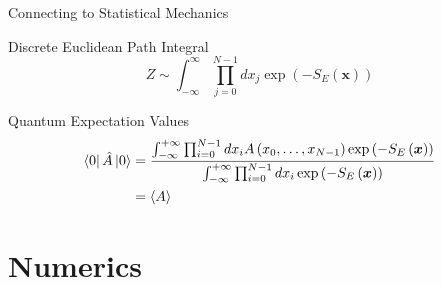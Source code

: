 \documentclass{beamer}
\begin{document}
    \begin{frame}{Connecting to Statistical Mechanics}
        {

            \begin{block}{Discrete Euclidean Path Integral}
                {  
                    \begin{equation*}
                        \label{eq:DiscreteEuclideanPathIntegral}
                        Z \sim \int^{\infty}_{-\infty}\prod^{N-1}_{j=0}dx_{j} \exp{\left(-S_E\left(\bm{x}\right)\right)}
                    \end{equation*}
                }
            \end{block}
        }

        {

            \begin{block}{Quantum Expectation Values}
                {  
                    \begin{align*}
                        \label{eq:SpecialEXP}
                        \bra{0}\hat{A}\ket{0} & = \frac{\int^{+\infty}_{-\infty}\prod_{i=0}^{N-1}dx_i A\left(x_0,\dots,x_{N-1}\right)\exp{\left(-S_{E}\left(\bm{x}\right)\right)}}{\int^{+\infty}_{-\infty}\prod_{i=0}^{N-1}dx_i \exp{\left(-S_{E}\left(\bm{x}\right)\right)}}\\
                                             & = \langle A \rangle
                    \end{align*}
                }
            \end{block}
        }
    \end{frame}


\section{Numerics}
\end{document}
